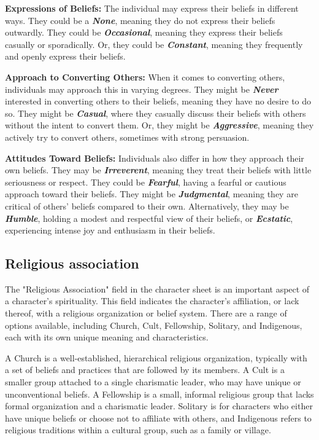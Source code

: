 \textbf{Expressions of Beliefs:} The individual may express their beliefs in different ways. They could be a \textbf{\textit{None}}, meaning they do not express their beliefs outwardly. They could be \textbf{\textit{Occasional}}, meaning they express their beliefs casually or sporadically. Or, they could be \textbf{\textit{Constant}}, meaning they frequently and openly express their beliefs.

\textbf{Approach to Converting Others:} When it comes to converting others, individuals may approach this in varying degrees. They might be \textbf{\textit{Never}} interested in converting others to their beliefs, meaning they have no desire to do so. They might be \textbf{\textit{Casual}}, where they casually discuss their beliefs with others without the intent to convert them. Or, they might be \textbf{\textit{Aggressive}}, meaning they actively try to convert others, sometimes with strong persuasion.

\textbf{Attitudes Toward Beliefs:} Individuals also differ in how they approach their own beliefs. They may be \textbf{\textit{Irreverent}}, meaning they treat their beliefs with little seriousness or respect. They could be \textbf{\textit{Fearful}}, having a fearful or cautious approach toward their beliefs. They might be \textbf{\textit{Judgmental}}, meaning they are critical of others’ beliefs compared to their own. Alternatively, they may be \textbf{\textit{Humble}}, holding a modest and respectful view of their beliefs, or \textbf{\textit{Ecstatic}}, experiencing intense joy and enthusiasm in their beliefs.

\subsection{\textbf{Religious association}}

The "Religious Association" field in the character sheet is an important aspect of a character's spirituality. This field indicates the character's affiliation, or lack thereof, with a religious organization or belief system. There are a range of options available, including Church, Cult, Fellowship, Solitary, and Indigenous, each with its own unique meaning and characteristics.

A Church is a well-established, hierarchical religious organization, typically with a set of beliefs and practices that are followed by its members. A Cult is a smaller group attached to a single charismatic leader, who may have unique or unconventional beliefs. A Fellowship is a small, informal religious group that lacks formal organization and a charismatic leader. Solitary is for characters who either have unique beliefs or choose not to affiliate with others, and Indigenous refers to religious traditions within a cultural group, such as a family or village.

